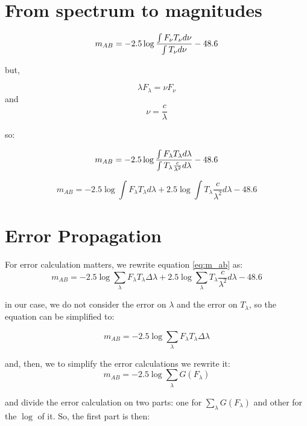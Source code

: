 \documentclass[11pt]{article}
\def\ni{\noindent}                                       %
\begin{document}
\section{From spectrum to magnitudes}

\begin{equation}
m_{AB} = -2.5 \log{ {\int F_\nu T_\nu d\nu}\over{\int T_\nu d\nu} } - 48.6
\end{equation}

\ni but,

$$ \lambda F_\lambda = \nu F_\nu $$ and $$ \nu = \frac{c}{\lambda} $$

so:

\begin{equation}
m_{AB} = -2.5 \log { {\int F_\lambda T_\lambda d\lambda}\over{\int T_\lambda \frac{c}{\lambda^2} d\lambda} } - 48.6
\end{equation}

\begin{equation}
\label{eq:m_ab}
m_{A B} = -2.5 \log \int F_\lambda T_\lambda d\lambda + 2.5 \log \int T_\lambda \frac{c}{\lambda^2} d\lambda - 48.6
\end{equation}

\section{Error Propagation}

For error calculation matters, we rewrite equation \ref{eq:m_ab} as:
\begin{equation}
\label{eq:m_ab_sum}
m_{A B} = -2.5 \log \sum_\lambda F_\lambda T_\lambda \Delta \lambda + 2.5 \log \sum_\lambda T_\lambda \frac{c}{\lambda^2} d\lambda - 48.6
\end{equation}

\ni in our case, we do not consider the error on $\lambda$ and the error on
$T_\lambda$, so the equation can be simplified to:

\begin{equation}
m_{A B} = -2.5 \log \sum_\lambda F_\lambda T_\lambda \Delta \lambda
\end{equation}

and, then, we to simplify the error calculations we rewrite it:
\begin{equation}
m_{A B} = -2.5 \log \sum_\lambda G(F_\lambda)
\end{equation}

\ni and divide the error calculation on two parts: one for $\sum_\lambda G(F_\lambda)$ and other
for the $\log$ of it. So, the first part is then:
\end{document}

